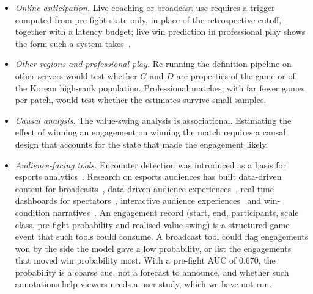 \begin{itemize}
  and without kills.
\item \emph{Online anticipation.} Live coaching or broadcast use requires a trigger computed from
  pre-fight state only, in place of the retrospective cutoff, together with a latency budget; live
  win prediction in professional play shows the form such a system takes~\cite{hodge2021win}.
\item \emph{Other regions and professional play.} Re-running the definition pipeline on other
  servers would test whether $G$ and $D$ are properties of the game or of the Korean high-rank
  population. Professional matches, with far fewer games per patch, would test whether the
  estimates survive small samples.
\item \emph{Causal analysis.} The value-swing analysis is associational. Estimating the effect of
  winning an engagement on winning the match requires a causal design that accounts for the state
  that made the engagement likely.
\item \emph{Audience-facing tools.} Encounter detection was introduced as a basis for esports
  analytics~\cite{schubert2016encounter}. Research on esports audiences has built data-driven content
  for broadcasts~\cite{block2018narrative}, data-driven audience experiences~\cite{kokkinakis2020dax},
  real-time dashboards for spectators~\cite{charleer2018dashboards}, interactive audience
  experiences~\cite{pedrassoli2024passive} and win-condition narratives~\cite{pedrassoli2024wincondition}.
  An engagement record (start, end, participants, scale class, pre-fight probability and realised
  value swing) is a structured game event that such tools could consume. A broadcast tool could flag
  engagements won by the side the model gave a low probability, or list the engagements that moved
  win probability most. With a pre-fight AUC of 0.670, the probability is a coarse cue, not a
  forecast to announce, and whether such annotations help viewers needs a user study, which we have
  not run.
\end{itemize}
